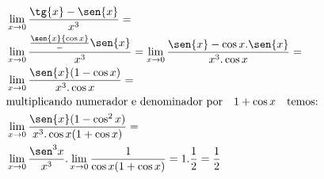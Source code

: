 \begin{ex}
\begin{align}
&\lim_{x\rightarrow 0} \frac{\tg{x}-\sen{x}}{x^3}=\nonumber\\
&\lim_{x\rightarrow 0} \frac{\frac{\sen{x}{\cos{x}}}-\sen{x}}{x^3}= \lim_{x\rightarrow 0} \frac{\sen{x}-\cos{x}.\sen{x}}{x^3.\cos{x}}=\nonumber\\
&\lim_{x\rightarrow 0} \frac{\sen{x}(1-\cos{x})}{x^3.\cos{x}}=\nonumber\\
&\text{multiplicando numerador e denominador por}\quad 1+\cos{x} \quad \text{temos:}\nonumber\\
&\lim_{x\rightarrow 0} \frac{\sen{x}(1-\cos^2{x})}{x^3.\cos{x}(1+\cos{x})}=\nonumber\\
&\lim_{x\rightarrow 0} \frac{\sen^3{x}}{x^3}.\lim_{x\rightarrow 0} \frac{1}{\cos{x}(1+\cos{x})}=1.\frac{1}{2}=\frac{1}{2}\nonumber
\end{align}
\end{ex}